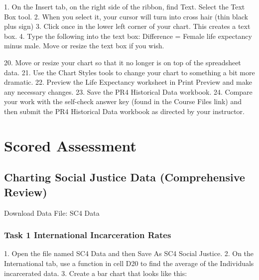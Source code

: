 1.   On the Insert tab, on the right side of the ribbon, find Text. Select the Text Box tool.
2.   When you select it, your cursor will turn into cross hair (thin black plus sign)
3.   Click once in the lower left corner of your chart. This creates a text box.
4.   Type the following into the text box: Difference = Female life expectancy minus male.
Move or resize the text box if you wish.

20.   Move or resize your chart so that it no longer is on top of the spreadsheet data.
21.   Use the Chart Styles tools to change your chart to something a bit more dramatic.
22.   Preview the Life Expectancy worksheet in Print Preview and make any necessary changes.
23.   Save the PR4 Historical Data workbook.
24.   Compare your work with the self-check answer key (found in the Course Files link) and then
submit the PR4 Historical Data workbook as directed by your instructor.

\section{Scored Assessment}




\subsection{Charting Social Justice Data (Comprehensive Review)}

Download Data File: SC4 Data

\subsubsection{Task 1 International Incarceration Rates}

1. Open the file named SC4 Data and then Save As SC4 Social Justice.
2. On the International tab, use a function in cell D20 to find the average of the Individuals
incarcerated data.
3. Create a bar chart that looks like this:



